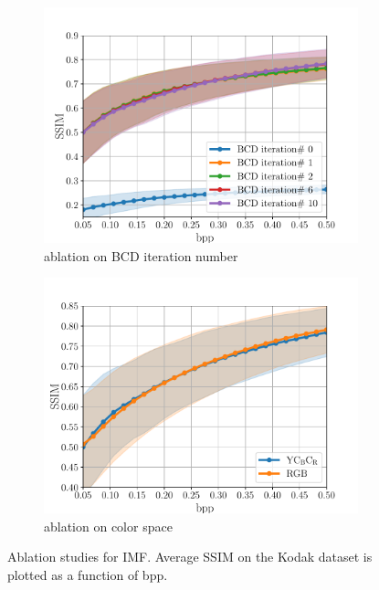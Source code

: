 \begin{figure}[t]
\begin{subfigure}{.45\textwidth}
		\includegraphics[width=.95\textwidth]{figures/ablation_iternum_ssim.pdf}
		\caption{ablation on BCD iteration number}
		\label{fig: iteration ablation ssim-vs-bpp}
	\end{subfigure}%
	\begin{subfigure}{.45\textwidth}
		\centering
		\includegraphics[width=.95\textwidth]{figures/ablation_colorspace_ssim.pdf}
		\caption{ablation on color space}
		\label{fig: colorspace ablation ssim-vs-bpp}
	\end{subfigure}
	\caption{Ablation studies for IMF. Average SSIM on the Kodak dataset is plotted as a function of bpp. 
    }
	\label{fig: ablation studies: ssim}
\end{figure}